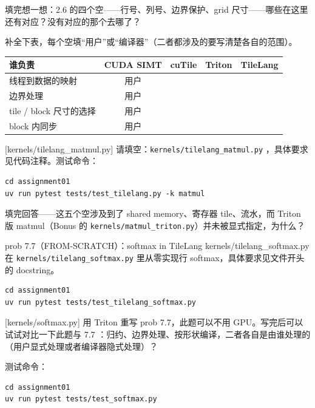\documentclass[11pt,a4paper,fontset=none]{ctexart}
\begin{document}
填完想一想：2.6 的四个空——行号、列号、边界保护、grid 尺寸——哪些在这里还有对应？没有对应的那个去哪了？

补全下表，每个空填“用户”或“编译器”（二者都涉及的要写清楚各自的范围）。

\begin{center}\small
\begin{tabular}{@{}lcccc@{}}
\toprule
谁负责 & CUDA SIMT & cuTile & Triton & TileLang \\
\midrule
线程到数据的映射 & 用户 & & & \\
边界处理 & 用户 & & & \\
tile / block 尺寸的选择 & 用户 & & & \\
block 内同步 & 用户 & & & \\
\bottomrule
\end{tabular}
\end{center}

[kernels/tilelang\_matmul.py]
请填空：\texttt{kernels/tilelang\_matmul.py} ，具体要求见代码注释。测试命令：

\begin{lstlisting}
cd assignment01
uv run pytest tests/test_tilelang.py -k matmul
\end{lstlisting}

填完回答——这五个空涉及到了 shared memory、寄存器 tile、流水，而 Triton 版 matmul（Bonus 的 \texttt{kernels/matmul\_triton.py}）并未被显式指定，为什么？

\begin{capstone}{prob 7.7（FROM-SCRATCH）：softmax in TileLang \hfill {\footnotesize\ttfamily kernels/tilelang\_softmax.py}}
在 \texttt{kernels/tilelang\_softmax.py} 里从零实现行 softmax，具体要求见文件开头的 docstring。
\end{capstone}

\begin{lstlisting}
cd assignment01
uv run pytest tests/test_tilelang_softmax.py
\end{lstlisting}

[kernels/softmax.py]
用 Triton 重写 prob 7.7，此题可以不用 GPU。写完后可以试试对比一下此题与 7.7 ：归约、边界处理、按形状编译，二者各自是由谁处理的（用户显式处理或者编译器隐式处理）？

测试命令：

\begin{lstlisting}
cd assignment01
uv run pytest tests/test_softmax.py
\end{lstlisting}
\end{document}
